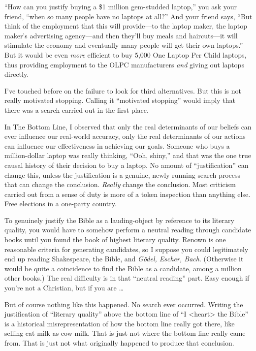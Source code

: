 {
 ``How can you justify buying a \$1 million
gem-studded laptop,'' you ask your friend,
``when so many people have no laptops at
all?'' And your friend says, ``But
think of the employment that this will provide---to the laptop maker,
the laptop maker's advertising agency---and then
they'll buy meals and haircuts---it will stimulate the
economy and eventually many people will get their own
laptops.'' But it would be even \textit{more}
efficient to buy 5,000 One Laptop Per Child laptops, thus providing
employment to the OLPC manufacturers \textit{and} giving out laptops
directly.}

{
 I've touched before on the failure to look for
third alternatives. But this is not really motivated stopping. Calling
it ``motivated stopping'' would
imply that there was a search carried out in the first place.}

{
 In The Bottom Line, I observed that only the real determinants of
our beliefs can ever influence our real-world accuracy, only the real
determinants of our actions can influence our effectiveness in
achieving our goals. Someone who buys a million-dollar laptop was
really thinking, ``Ooh, shiny,'' and
that was the one true causal history of their decision to buy a laptop.
No amount of ``justification'' can
change this, unless the justification is a genuine, newly running
search process that can change the conclusion. \textit{Really} change
the conclusion. Most criticism carried out from a sense of duty is more
of a token inspection than anything else. Free elections in a one-party
country.}

{
 To genuinely justify the Bible as a lauding-object by reference to
its literary quality, you would have to somehow perform a neutral
reading through candidate books until you found the book of highest
literary quality. Renown is one reasonable criteria for generating
candidates, so I suppose you could legitimately end up reading
Shakespeare, the Bible, and \textit{Gödel, Escher, Bach}. (Otherwise it
would be quite a coincidence to find the Bible as a candidate, among a
million other books.) The real difficulty is in that
``neutral reading'' part. Easy
enough if you're not a Christian, but if you are \ldots}

{
 But of course nothing like this happened. No search ever occurred.
Writing the justification of ``literary
quality'' above the bottom line of
``I {\textless}heart{\textgreater} the
Bible'' is a historical misrepresentation of how the
bottom line really got there, like selling cat milk as cow milk. That
is just not where the bottom line really came from. That is just not
what originally happened to produce that conclusion.}

